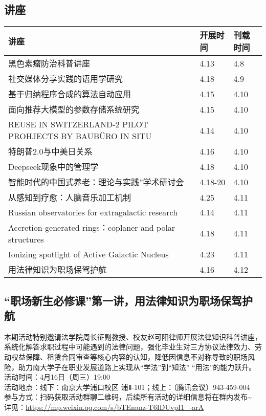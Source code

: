 \documentclass[letterpaper, 12pt]{article}
\begin{document}
\begin{multicols}{2}
\pagebreak

\section{讲座}
\begin{tabular}{|>{\centering\arraybackslash}m{}|m{}|m{}|}
    \hline
    讲座 & 开展时间 & 刊载时间\\
    \hline\hline
    黑色素瘤防治科普讲座 & 4.13 & 4.8\\\hline
    社交媒体分享实践的语用学研究 & 4.18 & 4.9\\\hline
    基于归纳程序合成的算法自动应用 & 4.15 & 4.10\\\hline
    面向推荐大模型的参数存储系统研究 & 4.15 & 4.10\\\hline
    REUSE IN SWITZERLAND-2 PILOT PROHJECTS BY BAUBÜRO IN SITU & 4.14 & 4.10\\\hline
    特朗普2.0与中美日关系 & 4.16 & 4.10\\\hline
    Deepseek现象中的管理学 & 4.18 & 4.10\\\hline
    智能时代的中国式养老：理论与实践”学术研讨会 & 4.18-20 & 4.10\\\hline
    从感知到疗愈：人脑音乐加工机制 & 4.25 & 4.11\\\hline
    Russian observatories for extragalactic research & 4.14 & 4.11\\\hline
    Accretion-generated rings：coplaner and polar structures & 4.18 & 4.11\\\hline
    Ionizing spotlight of Active Galactic Nucleus & 4.23 & 4.11\\\hline
    用法律知识为职场保驾护航 & 4.16 & 4.12\\\hline
\end{tabular}
\subsection{“职场新生必修课”第一讲，用法律知识为职场保驾护航}
本期活动特别邀请法学院周长征副教授、校友赵可阳律师开展法律知识科普讲座，系统化解答求职过程中可能遇到的法律问题，强化毕业生对三方协议法律效力、劳动权益保障、租赁合同审查等核心内容的认知，降低因信息不对称导致的职场风险，助力南大学子在职业发展道路上实现从“学法”到“知法” “用法”的能力跃升。
\\活动时间：4月16日（周三）19:00
\\活动地点：线下：南京大学浦口校区 浦Ⅱ-101；线上：（腾讯会议）943-459-004
\\参与方式：扫码获取活动群聊二维码，后续所有活动的详细信息将在群内发布\textasciitilde{}
\\详见：\url{https://mp.weixin.qq.com/s/bTEnanz-T6IDUvpI1_-arA}

\end{multicols}
\end{document}
